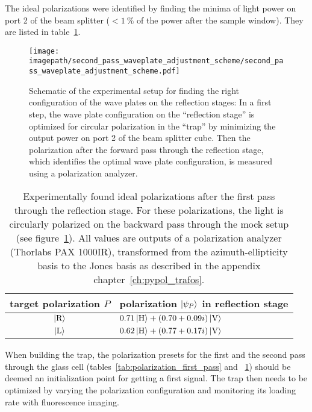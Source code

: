 The ideal polarizations were identified by finding the minima of light power on port 2 of the beam splitter ($< \SI{1}{\percent}$ of the power after the sample window). They are listed in table~\ref{tab:polarization_second_pass}.

\begin{figure}
    \centering
    \texttt{[image: \\imagepath/second\_pass\_waveplate\_adjustment\_scheme/second\_pass\_waveplate\_adjustment\_scheme.pdf]}
    \caption{Schematic of the experimental setup for finding the right configuration of the wave plates on the reflection stages: In a first step, the wave plate configuration on the ``reflection stage'' is optimized for circular polarization in the ``trap'' by minimizing the output power on port 2 of the beam splitter cube. Then the polarization after the forward pass through the reflection stage, which identifies the optimal wave plate configuration, is measured using a polarization analyzer.}\label{fig:second_pass_waveplate_adjustment_scheme}
\end{figure}

\begin{table}
    \centering
    \begin{tabular}{cl}
        \toprule
        \textbf{target polarization $P$} & \textbf{polarization $\Ket{\psi_P}$ in reflection stage} \\
        \toprule
        $\Ket{\text{R}}$ & $0.71 \Ket{\text{H}} + (0.70+0.09i) \Ket{\text{V}}$ \\
        $\Ket{\text{L}}$ & $0.62\Ket{\text{H}} + (0.77+0.17i)\Ket{\text{V}}$ \\
        \bottomrule
    \end{tabular}
    \caption{Experimentally found ideal polarizations after the first pass through the reflection stage. For these polarizations, the light is circularly polarized on the backward pass through the mock setup (see figure~\ref{fig:second_pass_waveplate_adjustment_scheme}). All values are outputs of a polarization analyzer (Thorlabs PAX 1000IR), transformed from the azimuth-ellipticity basis to the Jones basis as described in the appendix chapter~\ref{ch:pypol_trafos}.}
    \label{tab:polarization_second_pass}
\end{table}

When building the trap, the polarization presets for the first and the second pass through the glass cell (tables~\ref{tab:polarization_first_pass} and ~\ref{tab:polarization_second_pass}) should be deemed an initialization point for getting a first signal. The trap then needs to be optimized by varying the polarization configuration and monitoring its loading rate with fluorescence imaging.

